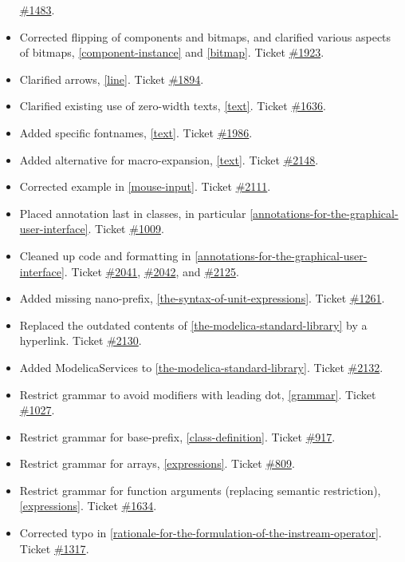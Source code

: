 \documentclass[../MLS.tex]{subfiles}
\begin{document}
\begin{itemize}
  \href{https://trac.modelica.org/Modelica/ticket/1483}{\#1483}.
\item
  Corrected flipping of components and bitmaps, and clarified various
  aspects of bitmaps, \autoref{component-instance} and \autoref{bitmap}. Ticket
  \href{https://trac.modelica.org/Modelica/ticket/1923}{\#1923}.
\item
  Clarified arrows, \autoref{line}. Ticket
  \href{https://trac.modelica.org/Modelica/ticket/1894}{\#1894}.
\item
  Clarified existing use of zero-width texts, \autoref{text}. Ticket
  \href{https://trac.modelica.org/Modelica/ticket/1636}{\#1636}.
\item
  Added specific fontnames, \autoref{text}. Ticket
  \href{https://trac.modelica.org/Modelica/ticket/1986}{\#1986}.
\item
  Added alternative for macro-expansion, \autoref{text}. Ticket
  \href{https://trac.modelica.org/Modelica/ticket/2148}{\#2148}.
\item
  Corrected example in \autoref{mouse-input}. Ticket
  \href{https://trac.modelica.org/Modelica/ticket/2111}{\#2111}.
\item
  Placed annotation last in classes, in particular \autoref{annotations-for-the-graphical-user-interface}. Ticket
  \href{https://trac.modelica.org/Modelica/ticket/1009}{\#1009}.
\item
  Cleaned up code and formatting in \autoref{annotations-for-the-graphical-user-interface}. Ticket
  \href{https://trac.modelica.org/Modelica/ticket/2041}{\#2041},
  \href{https://trac.modelica.org/Modelica/ticket/2042}{\#2042}, and
  \href{https://trac.modelica.org/Modelica/ticket/2125}{\#2125}.
\item
  Added missing nano-prefix, \autoref{the-syntax-of-unit-expressions}. Ticket
  \href{https://trac.modelica.org/Modelica/ticket/1261}{\#1261}.
\item
  Replaced the outdated contents of \autoref{the-modelica-standard-library} by a hyperlink. Ticket
  \href{https://trac.modelica.org/Modelica/ticket/2130}{\#2130}.
\item
  Added ModelicaServices to \autoref{the-modelica-standard-library}. Ticket
  \href{https://trac.modelica.org/Modelica/ticket/2132}{\#2132}.
\item
  Restrict grammar to avoid modifiers with leading dot, \autoref{grammar}.
  Ticket \href{https://trac.modelica.org/Modelica/ticket/1027}{\#1027}.
\item
  Restrict grammar for base-prefix, \autoref{class-definition}. Ticket
  \href{https://trac.modelica.org/Modelica/ticket/917}{\#917}.
\item
  Restrict grammar for arrays, \autoref{expressions}. Ticket
  \href{https://trac.modelica.org/Modelica/ticket/809}{\#809}.
\item
  Restrict grammar for function arguments (replacing semantic
  restriction), \autoref{expressions}. Ticket
  \href{https://trac.modelica.org/Modelica/ticket/1634}{\#1634}.
\item
  Corrected typo in \autoref{rationale-for-the-formulation-of-the-instream-operator}. Ticket
  \href{https://trac.modelica.org/Modelica/ticket/1317}{\#1317}.
\end{itemize}
\end{document}
